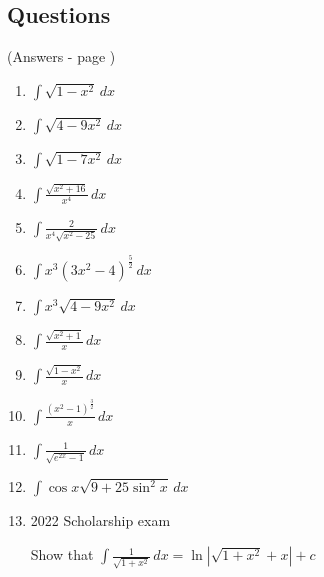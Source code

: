 \documentclass[../main.tex]{subfiles}
\begin{document}
    
\pagebreak

\subsection*{Questions}
(Answers - page \pageref*{Trig subs answers})
\label{Trig substitution}
\begin{enumerate}[itemsep=0.7cm]
    \item 
    \(\int \sqrt{1-x^2}\,dx\)

    \item 
    \(\int \sqrt{4-9x^2}\,dx\)

    \item 
    \(\int \sqrt{1-7x^2}\,dx\)

    \item 
    \(\int \frac{\sqrt{x^2+16}}{x^4}\,dx\)

    \item 
    \(\int \frac{2}{x^4\sqrt{x^2-25}}\,dx\)

    \item 
    \(\int x^3(3x^2-4)^{\frac{5}{2}}\,dx\)

    \item 
    \(\int x^3\sqrt{4-9x^2}\,dx\)

    \item 
    \(\int \frac{\sqrt{x^2+1}}{x}\,dx\)

    \item 
    \(\int \frac{\sqrt{1-x^2}}{x}\,dx\)

    \item 
    \(\int \frac{(x^2-1)^{\frac{3}{2}}}{x}\,dx\)

    \item
    $\int \frac{1}{\sqrt{e^{2x}-1}}\,dx$

    \item 
    \(\int \cos{x}\sqrt{9+25\sin^2{x}}\,dx\)

    \item 2022 Scholarship exam
    
    Show that \(\int \frac{1}{\sqrt{1+x^2}}\,dx=\ln{|\sqrt{1+x^2}+x|}+c\)
    
\end{enumerate}


\pagebreak
\end{document}
